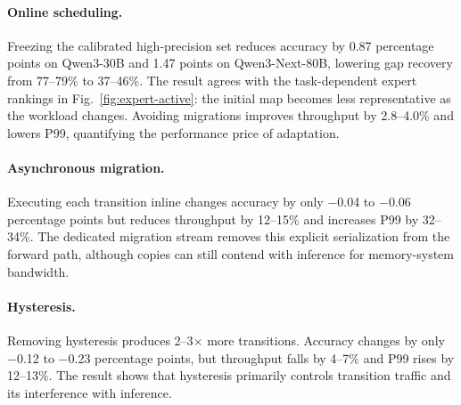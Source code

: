 \begin{table}[t]
\small
\centering
\caption{Component ablation (bs\,=\,32).}
\label{tab:ablation}
\vspace{-0.5em}
\setlength{\tabcolsep}{3pt}
\end{table}

\paragraph{Online scheduling.}
Freezing the calibrated high-precision set reduces accuracy by 0.87 percentage points on Qwen3-30B and 1.47 points on Qwen3-Next-80B, lowering gap recovery from 77--79\% to 37--46\%. The result agrees with the task-dependent expert rankings in Fig.~\ref{fig:expert-active}: the initial map becomes less representative as the workload changes. Avoiding migrations improves throughput by 2.8--4.0\% and lowers P99, quantifying the performance price of adaptation.

\paragraph{Asynchronous migration.}
Executing each transition inline changes accuracy by only $-$0.04 to $-$0.06 percentage points but reduces throughput by 12--15\% and increases P99 by 32--34\%. The dedicated migration stream removes this explicit serialization from the forward path, although copies can still contend with inference for memory-system bandwidth.

\paragraph{Hysteresis.}
Removing hysteresis produces 2--3$\times$ more transitions. Accuracy changes by only $-$0.12 to $-$0.23 percentage points, but throughput falls by 4--7\% and P99 rises by 12--13\%. The result shows that hysteresis primarily controls transition traffic and its interference with inference.

